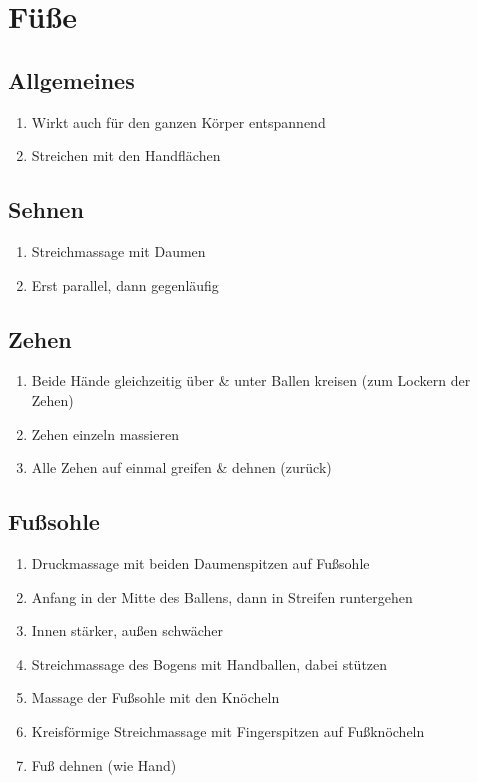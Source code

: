 \section{Füße}

\subsection{Allgemeines}
\begin{enumerate}
\item Wirkt auch für den ganzen Körper entspannend
\item Streichen mit den Handflächen
\end{enumerate}

\subsection{Sehnen}
\begin{enumerate}
\item Streichmassage mit Daumen
\item Erst parallel, dann gegenläufig
\end{enumerate}

\subsection{Zehen}
\begin{enumerate}
\item Beide Hände gleichzeitig über \& unter Ballen kreisen (zum Lockern der Zehen)
\item Zehen einzeln massieren
\item Alle Zehen auf einmal greifen \& dehnen (zurück)
\end{enumerate}

\subsection{Fußsohle}
\begin{enumerate}
\item Druckmassage mit beiden Daumenspitzen auf Fußsohle
\item Anfang in der Mitte des Ballens, dann in Streifen runtergehen
\item Innen stärker, außen schwächer
\item Streichmassage des Bogens mit Handballen, dabei stützen
\item Massage der Fußsohle mit den Knöcheln
\item Kreisförmige Streichmassage mit Fingerspitzen auf Fußknöcheln
\item Fuß dehnen (wie Hand)
\end{enumerate}

